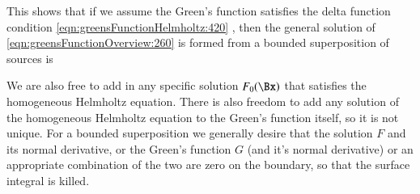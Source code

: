 This shows that if we assume the Green's function satisfies
the delta function condition
\cref{eqn:greensFunctionHelmholtz:420}
, then the general solution of
\cref{eqn:greensFunctionOverview:260} is
formed from a bounded superposition of sources is

We are also free to add in any specific solution \( F_0(\Bx) \) that satisfies the
homogeneous Helmholtz equation.
There is also freedom to add any solution of the homogeneous Helmholtz equation to the Green's function itself, so it is not unique.
For a bounded superposition we generally desire that the solution \( F \) and its normal derivative, or the Green's function \( G \) (and it's normal derivative) or an appropriate combination of the two are zero on the boundary, so that the surface integral is killed.

